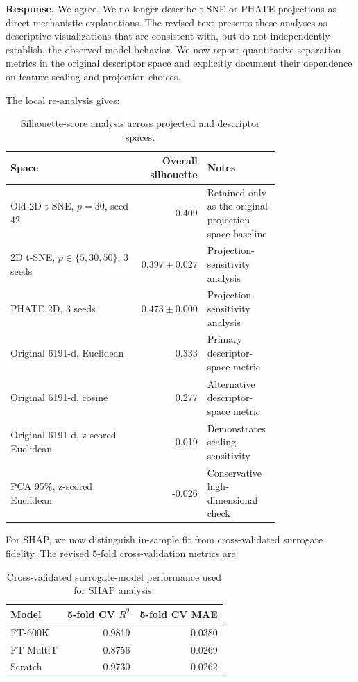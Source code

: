 \documentclass[11pt,a4paper]{article}
\begin{document}
\noindent\textbf{Response.}
We agree. We no longer describe t-SNE or PHATE projections as direct mechanistic explanations. The revised text presents these analyses as descriptive visualizations that are consistent with, but do not independently establish, the observed model behavior. We now report quantitative separation metrics in the original descriptor space and explicitly document their dependence on feature scaling and projection choices.

The local re-analysis gives:

\begin{table}[h]
\centering
\caption{Silhouette-score analysis across projected and descriptor spaces.}
\begin{tabular}{p{0.50\linewidth}rp{0.27\linewidth}}
\toprule
Space & Overall silhouette & Notes \\
\midrule
Old 2D t-SNE, $p=30$, seed 42 & 0.409 & Retained only as the original projection-space baseline \\
2D t-SNE, $p \in \{5,30,50\}$, 3 seeds & $0.397 \pm 0.027$ & Projection-sensitivity analysis \\
PHATE 2D, 3 seeds & $0.473 \pm 0.000$ & Projection-sensitivity analysis \\
Original 6191-d, Euclidean & 0.333 & Primary descriptor-space metric \\
Original 6191-d, cosine & 0.277 & Alternative descriptor-space metric \\
Original 6191-d, z-scored Euclidean & -0.019 & Demonstrates scaling sensitivity \\
PCA 95\%, z-scored Euclidean & -0.026 & Conservative high-dimensional check \\
\bottomrule
\end{tabular}
\end{table}

For SHAP, we now distinguish in-sample fit from cross-validated surrogate fidelity. The revised 5-fold cross-validation metrics are:

\begin{table}[h]
\centering
\caption{Cross-validated surrogate-model performance used for SHAP analysis.}
\begin{tabular}{lrr}
\toprule
Model & 5-fold CV $R^2$ & 5-fold CV MAE \\
\midrule
FT-600K & 0.9819 & 0.0380 \\
FT-MultiT & 0.8756 & 0.0269 \\
Scratch & 0.9730 & 0.0262 \\
\bottomrule
\end{tabular}
\end{table}
\end{document}
